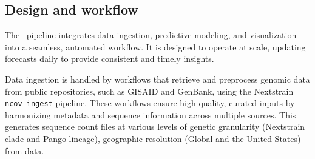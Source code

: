 


\subsection{Design and workflow}

The \forecastsNcov\ pipeline integrates data ingestion, predictive modeling, and visualization into a seamless, automated workflow.
It is designed to operate at scale, updating forecasts daily to provide consistent and timely insights.

Data ingestion is handled by workflows that retrieve and preprocess genomic data from public repositories, such as GISAID and GenBank, using the Nextstrain \texttt{ncov-ingest} pipeline.
These workflows ensure high-quality, curated inputs by harmonizing metadata and sequence information across multiple sources.
This generates sequence count files at various levels of genetic granularity (Nextstrain clade and Pango lineage), geographic resolution (Global and the United States) from data.

